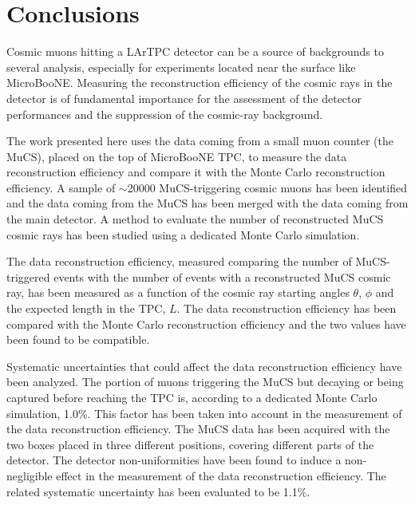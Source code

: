 \documentclass[a4paper,11pt]{article}
\begin{document}
\section{Conclusions}
Cosmic muons hitting a LArTPC detector can be a source of backgrounds to several analysis, especially for experiments located near the surface like MicroBooNE. Measuring the reconstruction efficiency of the cosmic rays in the detector is of fundamental importance for the assessment of the detector performances and the suppression of the cosmic-ray background.

The work presented here uses the data coming from a small muon counter (the MuCS), placed on the top of MicroBooNE TPC, to measure the data reconstruction efficiency and compare it with the Monte Carlo reconstruction efficiency.
A sample of $\sim$20000 MuCS-triggering cosmic muons has been identified and the data coming from the MuCS has been merged with the data coming from the main detector. A method to evaluate the number of reconstructed MuCS cosmic rays has been studied using a dedicated Monte Carlo simulation.

The data reconstruction efficiency, measured comparing the number of MuCS-triggered events with the number of events with a reconstructed MuCS cosmic ray, has been measured as a function of the cosmic ray starting angles $\theta$, $\phi$ and the expected length in the TPC, $L$. The data reconstruction efficiency has been compared with the Monte Carlo reconstruction efficiency and the two values have been found to be compatible.

Systematic uncertainties that could affect the data reconstruction efficiency have been analyzed. The portion of muons triggering the MuCS but decaying or being captured before reaching the TPC is, according to a dedicated Monte Carlo simulation, 1.0\%. This factor has been taken into account in the measurement of the data reconstruction efficiency.
The MuCS data has been acquired with the two boxes placed in three different positions, covering different parts of the detector. The detector non-uniformities have been found to induce a non-negligible effect in the measurement of the data reconstruction efficiency. The related systematic uncertainty has been evaluated to be 1.1\%.
\end{document}
